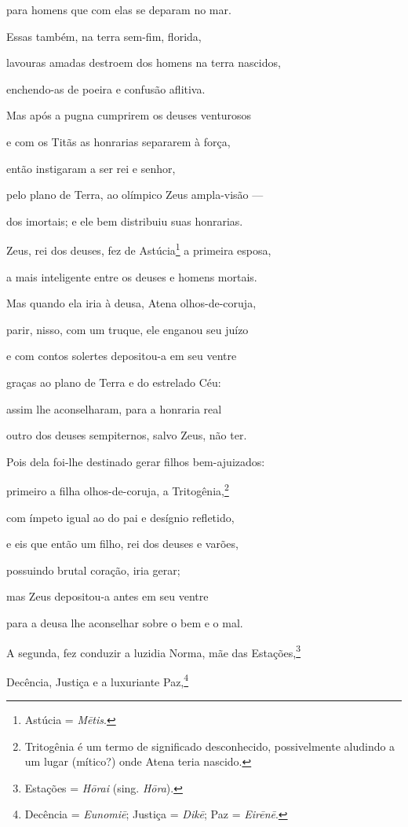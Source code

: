 \begin{pages}
\begin{Rightside}
para homens que com elas se deparam no mar.

Essas também, na terra sem-fim, florida,

lavouras amadas destroem dos homens na terra nascidos,

enchendo-as de poeira e confusão aflitiva. 

\medskip

Mas após a pugna cumprirem os deuses venturosos

e com os Titãs as honrarias separarem à força,

então instigaram a ser rei e senhor,

pelo plano de Terra, ao olímpico Zeus ampla-visão ---

dos imortais; e ele bem distribuiu suas honrarias. 

\quad{}Zeus, rei dos deuses, fez de Astúcia\footnote{Astúcia = \emph{Mētis}.} a primeira esposa,

a mais inteligente entre os deuses e homens mortais.

Mas quando ela iria à deusa, Atena olhos-de-coruja,

parir, nisso, com um truque, ele enganou seu juízo

e com contos solertes depositou-a em seu ventre 

graças ao plano de Terra e do estrelado Céu:

assim lhe aconselharam, para a honraria real

outro dos deuses sempiternos, salvo Zeus, não ter.

Pois dela foi-lhe destinado gerar filhos bem-ajuizados:

primeiro a filha olhos-de-coruja, a Tritogênia,\footnote{Tritogênia é um termo de significado desconhecido, possivelmente
aludindo a um lugar (mítico?) onde Atena teria nascido.} 

com ímpeto igual ao do pai e desígnio refletido,

e eis que então um filho, rei dos deuses e varões,

possuindo brutal coração, iria gerar;

mas Zeus depositou-a antes em seu ventre

para a deusa lhe aconselhar sobre o bem e o mal. 

\quad{}A segunda, fez conduzir a luzidia Norma, mãe das Estações,\footnote{Estações = \emph{Hōrai} (sing. \emph{Hōra}).}

Decência, Justiça e a luxuriante Paz,\footnote{Decência = \emph{Eunomiē}; Justiça = \emph{Dikē}; Paz = \emph{Eirēnē}.}


\end{Rightside}
\end{pages}
